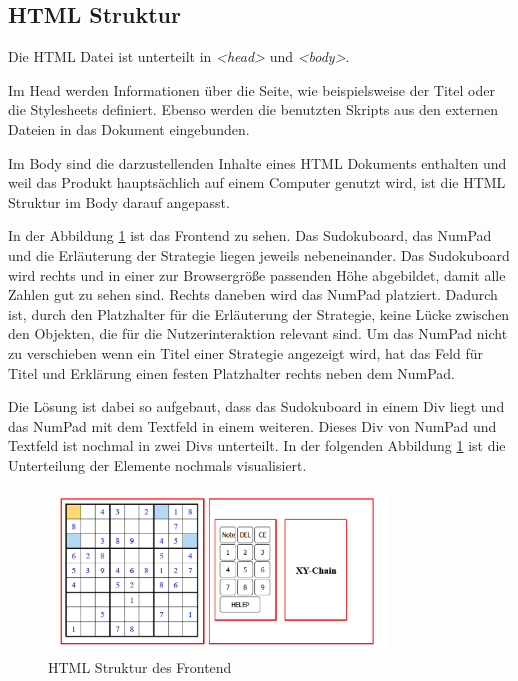 \subsection{\ac{HTML} Struktur}
Die \ac{HTML} Datei ist unterteilt in \textit{<head>} und \textit{<body>}. 

Im Head werden Informationen über die Seite, wie beispielsweise der Titel oder die Stylesheets definiert. Ebenso werden die benutzten Skripts aus den externen Dateien in das Dokument eingebunden. 

Im Body sind die darzustellenden Inhalte eines \ac{HTML} Dokuments enthalten und weil das Produkt hauptsächlich auf einem Computer genutzt wird, ist die \ac{HTML} Struktur im Body darauf angepasst.

In der Abbildung \ref{fig:AbbildungFrontend} ist das Frontend zu sehen. Das Sudokuboard, das NumPad und die Erläuterung der Strategie liegen jeweils nebeneinander. Das Sudokuboard wird rechts und in einer zur Browsergröße passenden Höhe abgebildet, damit alle Zahlen gut zu sehen sind. Rechts daneben wird das NumPad platziert. Dadurch ist, durch den Platzhalter für die Erläuterung der Strategie, keine Lücke zwischen den Objekten, die für die Nutzerinteraktion relevant sind. Um das NumPad nicht zu verschieben wenn ein Titel einer Strategie angezeigt wird, hat das Feld für Titel und Erklärung einen festen Platzhalter rechts neben dem NumPad.

Die Lösung ist dabei so aufgebaut, dass das Sudokuboard in einem Div liegt und das NumPad mit dem Textfeld in einem weiteren. Dieses Div von NumPad und Textfeld ist nochmal in zwei Divs unterteilt. In der folgenden Abbildung \ref{fig:AbbildungFrontend} ist die Unterteilung der Elemente nochmals visualisiert.

\begin{figure}[htbp]
	\centering
	\includegraphics[width=0.8\textwidth]{images/AbbildungFrontendRot.png}
	\caption{\ac{HTML} Struktur des Frontend}
	\label{fig:AbbildungFrontend}
\end{figure}

